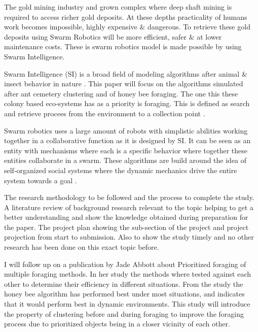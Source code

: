 \documentclass[12pt]{article}
\begin{document}
\par{The gold mining industry and grown complex where deep shaft mining is required to access richer gold deposits. At these depths practicality of humans work becomes impossible, highly expensive \& dangerous. To retrieve these gold deposits using Swarm Robotics will be more efficient, safer \& at lower maintenance costs. These is swarm robotics model is made possible by using Swarm Intelligence.}
\\
\par{Swarm Intelligence (SI) is a broad field of modeling algorithms after animal \& insect behavior in nature \cite{SI}. This paper will focus on the algorithms simulated after ant cemetery clustering and of honey bee foraging. The one this these colony based eco-systems has as a priority is foraging. This is defined as search and retrieve procees from the environment to a collection point \cite{Forage-09}.}
\\
\par{Swarm robotics uses a large amount of robots with simplistic abilities working together in a collaborative function \cite{Robots-Dorigo} as it is designed by SI. It can be seen as an entity with mechanisms where each is a specific behavior where together these entities collaborate in a swarm. These algorithms are build around the idea of self-organized social systems where the dynamic mechanics drive the entire system towards a goal \cite{SI}.}
\\
\par{The research methodology to be followed and the process to complete the study. A literature review of background research relevant to the topic helping to get a better understanding and show the knowledge obtained during preparation for the paper. The project plan showing the sub-section of the project and project projection from start to submission. Also to show the study timely and no other research has been done on this exact topic before.}
\\
\par{I will follow up on a publication by Jade Abbott \cite{Jade-2014} about Prioritized foraging of multiple foraging methods. In her study the methods where tested against each other to determine their efficiency in different situations. From the study the honey bee algorithm has performed best under most situations, and indicates that it would perform best in dynamic environments. This study will introduce the property of clustering before and during foraging to improve the foraging process due to prioritized objects being in a closer vicinity of each other.}
\end{document}
